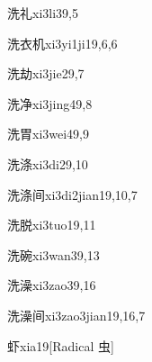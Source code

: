 \begin{verbete}{洗礼}{xi3li3}{9,5}
\end{verbete}

\begin{verbete}{洗衣机}{xi3yi1ji1}{9,6,6}
\end{verbete}

\begin{verbete}{洗劫}{xi3jie2}{9,7}
\end{verbete}

\begin{verbete}{洗净}{xi3jing4}{9,8}
\end{verbete}

\begin{verbete}{洗胃}{xi3wei4}{9,9}
\end{verbete}

\begin{verbete}{洗涤}{xi3di2}{9,10}
\end{verbete}

\begin{verbete}{洗涤间}{xi3di2jian1}{9,10,7}
\end{verbete}

\begin{verbete}{洗脱}{xi3tuo1}{9,11}
\end{verbete}

\begin{verbete}{洗碗}{xi3wan3}{9,13}
\end{verbete}

\begin{verbete}{洗澡}{xi3zao3}{9,16}
\end{verbete}

\begin{verbete}{洗澡间}{xi3zao3jian1}{9,16,7}
\end{verbete}

\begin{verbete}{虾}{xia1}{9}[Radical 虫]
\end{verbete}

